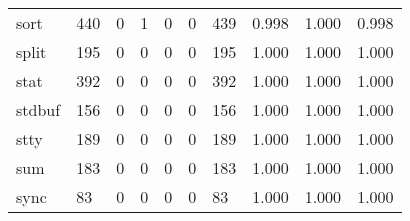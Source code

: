 \begin{longtable}{lp{1.3cm}p{1.3cm}p{1.3cm}p{1.3cm}p{1.3cm}p{1.3cm}p{1.3cm}p{1.3cm}p{1.3cm}}
sort      &                    440 &                                             0 &                                            1 &                                           0 &                                            0 &                                        439 &                                0.998 &                                  1.000 &                                0.998 \\
split     &                    195 &                                             0 &                                            0 &                                           0 &                                            0 &                                        195 &                                1.000 &                                  1.000 &                                1.000 \\
stat      &                    392 &                                             0 &                                            0 &                                           0 &                                            0 &                                        392 &                                1.000 &                                  1.000 &                                1.000 \\
stdbuf    &                    156 &                                             0 &                                            0 &                                           0 &                                            0 &                                        156 &                                1.000 &                                  1.000 &                                1.000 \\
stty      &                    189 &                                             0 &                                            0 &                                           0 &                                            0 &                                        189 &                                1.000 &                                  1.000 &                                1.000 \\
sum       &                    183 &                                             0 &                                            0 &                                           0 &                                            0 &                                        183 &                                1.000 &                                  1.000 &                                1.000 \\
sync      &                     83 &                                             0 &                                            0 &                                           0 &                                            0 &                                         83 &                                1.000 &                                  1.000 &                                1.000 \\

\end{longtable}
